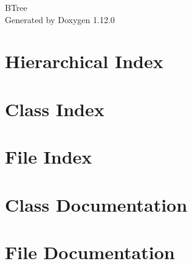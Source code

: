 \documentclass[twoside]{book}
\newcommand{\+}{\discretionary{\mbox{\scriptsize$\hookleftarrow$}}{}{}}
\newcommand{\clearemptydoublepage}{%
    \newpage{\pagestyle{empty}\cleardoublepage}%
  }
\begin{document}
  \raggedbottom
    \hypersetup{pageanchor=false,
                bookmarksnumbered=true,
                pdfencoding=unicode
               }
  \begin{titlepage}
  \vspace*{7cm}
  \begin{center}%
  {\Large BTree}\\
  \vspace*{1cm}
  {\large Generated by Doxygen 1.12.0}\\
  \end{center}
  \end{titlepage}
  \clearemptydoublepage
  \tableofcontents
  \clearemptydoublepage
  \hypersetup{pageanchor=true}


\chapter{Hierarchical Index}

\chapter{Class Index}

\chapter{File Index}

\chapter{Class Documentation}

























\chapter{File Documentation}














  \backmatter
  \newpage
  \clearemptydoublepage
  \printindex
\end{document}
